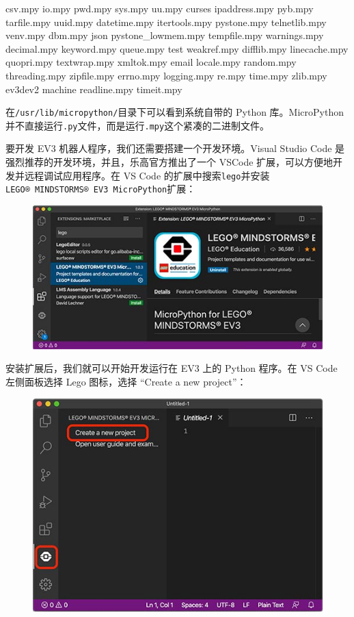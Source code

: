 \begin{pythoncode}
csv.mpy          io.mpy         pwd.mpy              sys.mpy           uu.mpy
curses           ipaddress.mpy  pyb.mpy              tarfile.mpy       uuid.mpy
datetime.mpy     itertools.mpy  pystone.mpy          telnetlib.mpy     venv.mpy
dbm.mpy          json           pystone_lowmem.mpy   tempfile.mpy      warnings.mpy
decimal.mpy      keyword.mpy    queue.mpy            test              weakref.mpy
difflib.mpy      linecache.mpy  quopri.mpy           textwrap.mpy      xmltok.mpy
email            locale.mpy     random.mpy           threading.mpy     zipfile.mpy
errno.mpy        logging.mpy    re.mpy               time.mpy          zlib.mpy
ev3dev2          machine        readline.mpy         timeit.mpy
\end{pythoncode}

在\texttt{/usr/lib/micropython/}目录下可以看到系统自带的 Python
库。MicroPython
并不直接运行\texttt{.py}文件，而是运行\texttt{.mpy}这个紧凑的二进制文件。

要开发 EV3 机器人程序，我们还需要搭建一个开发环境。Visual Studio Code
是强烈推荐的开发环境，并且，乐高官方推出了一个 VSCode
扩展，可以方便地开发并远程调试应用程序。在 VS Code
的扩展中搜索\texttt{lego}并安装\texttt{LEGO®\ MINDSTORMS®\ EV3\ MicroPython}扩展：

 
 \begin{figure}[htp]
	\centering
	\includegraphics[width=0.6\linewidth]{fig/1346189421183041l.png}
\end{figure}


安装扩展后，我们就可以开始开发运行在 EV3 上的 Python 程序。在 VS Code
左侧面板选择 Lego 图标，选择 ``Create a new project''：

 
 \begin{figure}[htp]
	\centering
	\includegraphics[width=0.6\linewidth]{fig/1346190218100802l.png}
\end{figure}


